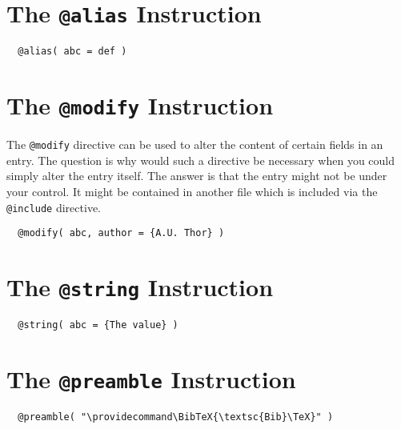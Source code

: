 \section{The \texttt{@alias} Instruction}

\begin{verbatim}
  @alias( abc = def )
\end{verbatim}

\INCOMPLETE

\section{The \texttt{@modify} Instruction}

The \texttt{@modify} directive can be used to alter the content of
certain fields in an entry. The question is why would such a directive
be necessary when you could simply alter the entry itself. The answer
is that the entry might not be under your control. It might be
contained in another file which is included via the \texttt{@include}
directive.

\begin{verbatim}
  @modify( abc, author = {A.U. Thor} )
\end{verbatim}

\INCOMPLETE

\section{The \texttt{@string} Instruction}

\begin{verbatim}
  @string( abc = {The value} )
\end{verbatim}

\INCOMPLETE

\section{The \texttt{@preamble} Instruction}

\begin{verbatim}
  @preamble( "\providecommand\BibTeX{\textsc{Bib}\TeX}" )
\end{verbatim}

\INCOMPLETE


\endinput
%
